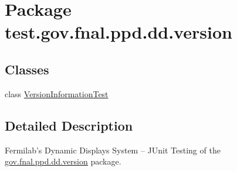 \hypertarget{namespacetest_1_1gov_1_1fnal_1_1ppd_1_1dd_1_1version}{\section{Package test.\-gov.\-fnal.\-ppd.\-dd.\-version}
\label{namespacetest_1_1gov_1_1fnal_1_1ppd_1_1dd_1_1version}
}
\subsection*{Classes}
\begin{DoxyCompactItemize}
\item 
class \hyperlink{classtest_1_1gov_1_1fnal_1_1ppd_1_1dd_1_1version_1_1VersionInformationTest}{Version\-Information\-Test}
\end{DoxyCompactItemize}


\subsection{Detailed Description}
Fermilab's Dynamic Displays System -- J\-Unit Testing of the \hyperlink{namespacetest_1_1gov_1_1fnal_1_1ppd_1_1dd_1_1version}{gov.\-fnal.\-ppd.\-dd.\-version} package.